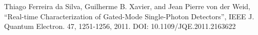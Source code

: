 \begin{thebibliography}{9}

  Thiago Ferreira da Silva, Guilherme B. Xavier, and Jean Pierre von der Weid,
  ``Real-time Characterization of Gated-Mode Single-Photon Detectors'',
  IEEE J. Quantum Electron. 47, 1251-1256,
  2011.
  DOI: 10.1109/JQE.2011.2163622

\end{thebibliography}